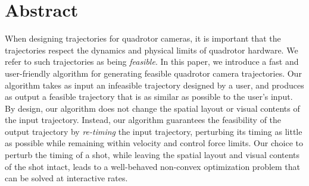 



\section{Abstract}

When designing trajectories for quadrotor cameras, it is important that the  trajectories respect the dynamics and physical limits of quadrotor hardware.
We refer to such trajectories as being \emph{feasible}.
In this paper, we introduce a fast and user-friendly algorithm for generating feasible quadrotor camera trajectories.
Our algorithm takes as input an infeasible trajectory designed by a user, and produces as output a feasible trajectory that is as similar as possible to the user's input.
By design, our algorithm does not change the spatial layout or  visual contents of the input trajectory.
Instead, our algorithm guarantees the feasibility of the output trajectory by \emph{re-timing} the input trajectory, perturbing its timing as little as possible while remaining within velocity and control force limits.
Our choice to perturb the timing of a shot, while leaving the spatial layout and visual contents of the shot intact, leads to a well-behaved non-convex optimization problem that can be solved at interactive rates.

